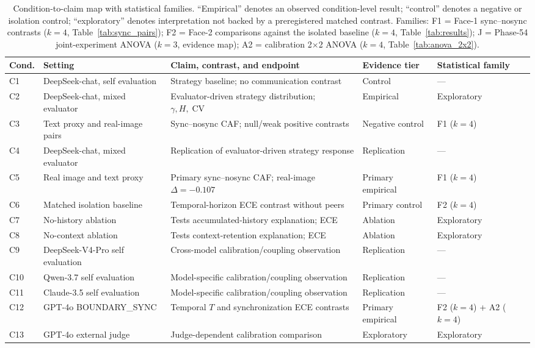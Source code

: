 \documentclass[11pt]{article}
\DeclareMathOperator{\CV}{CV}
\begin{document}
\begin{table}[t]
\centering
\caption{Condition-to-claim map with statistical families. ``Empirical'' denotes an observed condition-level result; ``control'' denotes a negative or isolation control; ``exploratory'' denotes interpretation not backed by a preregistered matched contrast. Families: F1 = Face-1 sync--nosync contrasts ($k{=}4$, Table~\ref{tab:sync_pairs}); F2 = Face-2 comparisons against the isolated baseline ($k{=}4$, Table~\ref{tab:results}); J = Phase-54 joint-experiment ANOVA ($k{=}3$, evidence map); A2 = calibration 2$\times$2 ANOVA ($k{=}4$, Table~\ref{tab:anova_2x2}).}
\label{tab:cond-overview}
\small
\begin{tabularx}{\textwidth}{@{}l p{} X p{} p{}@{}}
\toprule
\textbf{Cond.} & \textbf{Setting} & \textbf{Claim, contrast, and endpoint} & \textbf{Evidence tier} & \textbf{Statistical family} \\
\midrule
C1 & DeepSeek-chat, self evaluation & Strategy baseline; no communication contrast & Control & --- \\
C2 & DeepSeek-chat, mixed evaluator & Evaluator-driven strategy distribution; $\gamma,H,\CV$ & Empirical & Exploratory \\
C3 & Text proxy and real-image pairs & Sync--nosync CAF; null/weak positive contrasts & Negative control & F1 ($k{=}4$) \\
C4 & DeepSeek-chat, mixed evaluator & Replication of evaluator-driven strategy response & Replication & --- \\
C5 & Real image and text proxy & Primary sync--nosync CAF; real-image $\Delta=-0.107$ & Primary empirical & F1 ($k{=}4$) \\
C6 & Matched isolation baseline & Temporal-horizon ECE contrast without peers & Primary control & F2 ($k{=}4$) \\
C7 & No-history ablation & Tests accumulated-history explanation; ECE & Ablation & Exploratory \\
C8 & No-context ablation & Tests context-retention explanation; ECE & Ablation & Exploratory \\
C9 & DeepSeek-V4-Pro self evaluation & Cross-model calibration/coupling observation & Replication & --- \\
C10 & Qwen-3.7 self evaluation & Model-specific calibration/coupling observation & Replication & --- \\
C11 & Claude-3.5 self evaluation & Model-specific calibration/coupling observation & Replication & --- \\
C12 & GPT-4o BOUNDARY\_SYNC & Temporal $T$ and synchronization ECE contrasts & Primary empirical & F2 ($k{=}4$) + A2 ($k{=}4$) \\
C13 & GPT-4o external judge & Judge-dependent calibration comparison & Exploratory & Exploratory \\
\bottomrule
\end{tabularx}
\end{table}
\end{document}
